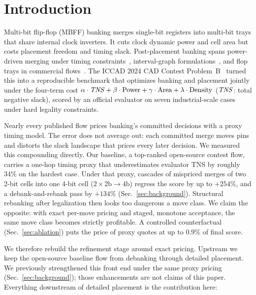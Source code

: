 \section{Introduction}

Multi-bit flip-flop (MBFF) banking merges single-bit registers into multi-bit trays that share internal clock inverters. It cuts clock dynamic power and cell area but costs placement freedom and timing slack. Post-placement banking spans power-driven merging under timing constraints~\cite{chang2010postplacement}, interval-graph formulations~\cite{shyu2013effective}, and flop trays in commercial flows~\cite{kahng2016floptray}. The ICCAD 2024 CAD Contest Problem~B~\cite{yang2024contest} turned this into a reproducible benchmark that optimizes banking and placement jointly under the four-term cost $\alpha\cdot\mathit{TNS} + \beta\cdot\mathrm{Power} + \gamma\cdot\mathrm{Area} + \lambda\cdot\mathrm{Density}$ ($\mathit{TNS}$: total negative slack), scored by an official evaluator on seven industrial-scale cases under hard legality constraints.

Nearly every published flow prices banking's committed decisions with a proxy timing model. The error does not average out: each committed merge moves pins and distorts the slack landscape that prices every later decision. We measured this compounding directly. Our baseline, a top-ranked open-source contest flow, carries a one-hop timing proxy that underestimates evaluator TNS by roughly 34\% on the hardest case. Under that proxy, cascades of mispriced merges of two 2-bit cells into one 4-bit cell ($2{\times}2\mathrm{b}{\to}4\mathrm{b}$) regress the score by up to $+254\%$, and a debank-and-rebank pass by $+134\%$ (Sec.~\ref{sec:background}). Structural rebanking after legalization then looks too dangerous a move class. We claim the opposite: with exact per-move pricing and staged, monotone acceptance, the same move class becomes strictly profitable. A controlled counterfactual (Sec.~\ref{sec:ablation}) puts the price of proxy quotes at up to $0.9\%$ of final score.

We therefore rebuild the refinement stage around exact pricing. Upstream we keep the open-source baseline flow from debanking through detailed placement. We previously strengthened this front end under the same proxy pricing (Sec.~\ref{sec:background}); those enhancements are not claims of this paper. Everything downstream of detailed placement is the contribution here:


